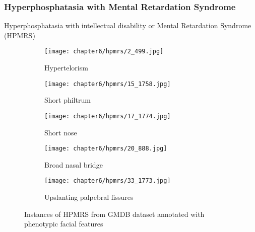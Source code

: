 \documentclass[../report.tex]{subfiles}
\begin{document}
	\subsubsection{Hyperphosphatasia with Mental Retardation Syndrome}
	Hyperphosphatasia with intellectual disability or Mental Retardation Syndrome (HPMRS) 
	 \begin{figure}[H]\label{fig_hpmrs}
	 	\centering
	 	\begin{subfigure}[t]{0.17\textwidth}
	 		\centering
	 		\texttt{[image: chapter6/hpmrs/2\_499.jpg]}
	 		\caption{Hypertelorism}
	 	\end{subfigure}
	 	\begin{subfigure}[t]{0.17\textwidth}
	 		\centering
	 		\texttt{[image: chapter6/hpmrs/15\_1758.jpg]}
	 		\caption{Short philtrum}
	 	\end{subfigure}	
	 	\begin{subfigure}[t]{0.17\textwidth}
	 		\centering
	 		\texttt{[image: chapter6/hpmrs/17\_1774.jpg]}
			\caption{Short nose}
	 	\end{subfigure}	
	 	\begin{subfigure}[t]{0.17\textwidth}
	 		\centering
	 		\texttt{[image: chapter6/hpmrs/20\_888.jpg]}
	 		\caption{Broad nasal bridge}
	 	\end{subfigure}	
	 	\begin{subfigure}[t]{0.17\textwidth}
	 		\centering
	 		\texttt{[image: chapter6/hpmrs/33\_1773.jpg]}
	 		\caption{Upslanting palpebral fissures}
	 	\end{subfigure}	
	 	\caption[Instances of HPMRS from GMDB dataset]{Instances of HPMRS from GMDB dataset annotated with phenotypic facial features}
	 \end{figure}
	 
\end{document}
